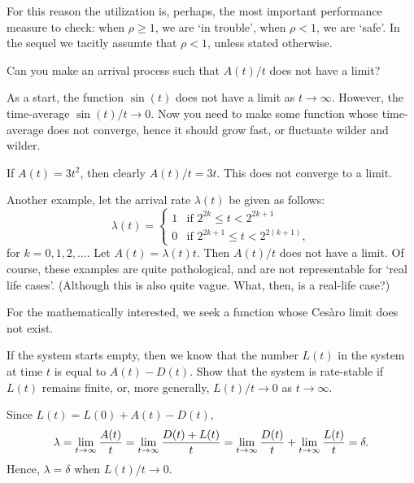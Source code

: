 For this reason the utilization is, perhaps, the most important performance measure to check: when $\rho\geq 1$, we are `in trouble', when $\rho < 1$, we are `safe'.
In the sequel we tacitly assumte that $\rho<1$, unless stated otherwise.


\begin{exercise}
  Can you make an arrival process such that $A(t)/t$ does not have a limit?
\begin{hint}
  As a start, the function $\sin(t)$ does not have a limit as $t\to\infty$.
  However, the time-average $\sin(t)/t \to 0$.
  Now you need to make some function whose time-average does not converge, hence it should grow fast, or fluctuate wilder and wilder.
\end{hint}
\begin{solution}
 If $A(t) = 3 t^2$, then clearly $A(t)/t = 3t$. This does not
 converge to a limit.

 Another example, let the arrival rate $\lambda(t)$ be given as follows:
 \begin{equation*}
 \lambda(t) =
 \begin{cases}
 1 & \text{if } 2^{2k} \leq t < 2^{2k+1} \\
 0 & \text{if } 2^{2k+1} \leq t < 2^{2(k+1)},
 \end{cases}
 \end{equation*}
 for $k=0,1,2,\ldots$.
 Let $A(t) = \lambda(t) t$.
 Then $A(t)/t$ does not have a limit.
 Of course, these examples are quite pathological, and are not representable for `real life cases'.
 (Although this is also quite vague.
 What, then, is a real-life case?)

 For the mathematically interested, we seek a function whose Ces\`aro limit does not exist.
\end{solution}
\end{exercise}


\begin{exercise}\label{ex:98}
If the system starts empty, then we know that the number $L(t)$ in the system at time $t$ is equal to $A(t) - D(t)$.
Show that the system is rate-stable  if $L(t)$ remains finite, or, more generally, $L(t)/t \to 0$ as $t\to\infty$.
\begin{solution}
Since $L(t) = L(0) + A(t) - D(t)$,
\begin{equation*}
 \lambda = \lim_{t \to \infty} \frac{A(t)}t = \lim_{t \to \infty} \frac{D(t)+L(t)}t = \lim_{t \to \infty} \frac{D(t)}t + \lim_{t \to \infty} \frac{L(t)}t
 = \delta.
\end{equation*}
Hence, $\lambda=\delta$ when $L(t)/t\to0$.
\end{solution}
\end{exercise}




